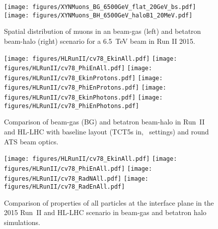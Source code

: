 \begin{figure}
  \centering
    \texttt{[image: figures/XYNMuons\_BG\_6500GeV\_flat\_20GeV\_bs.pdf]}  
    \texttt{[image: figures/XYNMuons\_BH\_6500GeV\_haloB1\_20MeV.pdf]}
  \caption{Spatial distribution of muons in an beam-gas (left) and betatron beam-halo (right) scenario for a 6.5~TeV beam in Run II 2015. 
    \label{fig:XYNMuons2}}
\end{figure}

\begin{figure}
\begin{center}
  \texttt{[image: figures/HLRunII/cv78\_EkinAll.pdf]}
  \texttt{[image: figures/HLRunII/cv78\_PhiEnAll.pdf]}
  \texttt{[image: figures/HLRunII/cv78\_EkinProtons.pdf]}
  \texttt{[image: figures/HLRunII/cv78\_PhiEnProtons.pdf]}
  \texttt{[image: figures/HLRunII/cv78\_EkinPhotons.pdf]}
  \texttt{[image: figures/HLRunII/cv78\_PhiEnPhotons.pdf]}
\end{center}
\vspace{-0.6cm}
 \caption{Comparison of beam-gas (BG) and betatron beam-halo in Run~II and HL-LHC with baseline layout (TCT5s in, \twosigmaret~settings) and round ATS beam optics.
  \label{fig:hlrun22}}
\end{figure}




\clearpage

\begin{figure}
\begin{center}
  \texttt{[image: figures/HLRunII/cv78\_EkinAll.pdf]}
  \texttt{[image: figures/HLRunII/cv78\_PhiEnAll.pdf]}
  \texttt{[image: figures/HLRunII/cv78\_RadNAll.pdf]}
  \texttt{[image: figures/HLRunII/cv78\_RadEnAll.pdf]}      
\end{center}
\vspace{-0.6cm}
 \caption{Comparison of properties of all particles at the interface plane in the 2015 Run~II and HL-LHC scenario in beam-gas and betatron halo simulations.
  \label{fig:compHLRun2All}}
\end{figure}

